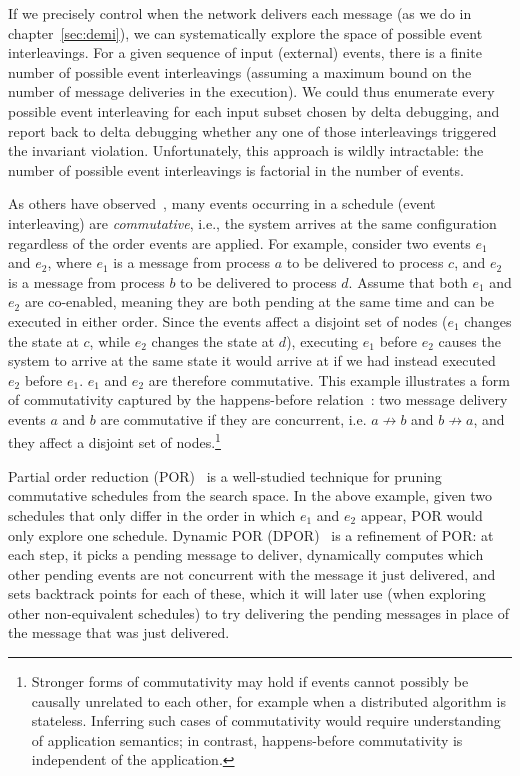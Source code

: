 If we precisely control when the network delivers each message (as we do in
chapter~\ref{sec:demi}), we can
systematically explore the space of possible event interleavings.
For a given sequence of input (external) events, there is a finite number of
possible event interleavings (assuming a maximum bound on the number of
message deliveries in the execution). We could thus enumerate every possible
event interleaving for each input subset chosen by delta debugging,
and report back to delta debugging whether any one of those interleavings
triggered the invariant violation. Unfortunately, this approach is wildly intractable: the
number of possible event interleavings is factorial in the number
of events.

As others have observed~\cite{godefroid1995partial}, many events occurring in
a schedule (event interleaving) are {\em commutative}, i.e., the system arrives at the same
configuration regardless of the order events are applied. For example, consider two events $e_1$ and $e_2$, where
$e_1$ is a message from process $a$ to be delivered to
process $c$, and $e_2$ is a message from process $b$
to be delivered to process $d$. Assume that both $e_1$ and $e_2$ are co-enabled, meaning they are both pending at the same time and can be executed in either order. Since
the events affect a disjoint set of nodes ($e_1$ changes the state at $c$, while $e_2$ changes the state at $d$), executing $e_1$ before $e_2$ causes the system to arrive at the same state it would arrive at if we had instead executed $e_2$ before $e_1$.
$e_1$ and $e_2$ are therefore commutative. This example
illustrates a form of commutativity captured by the happens-before relation~\cite{Lamport:1978:TCO:359545.359563}: two message delivery events
$a$ and $b$ are commutative if they are concurrent, i.e. $a \not\rightarrow b$
and $b \not\rightarrow a$, and they affect a disjoint set of nodes.\footnote{
Stronger forms of
commutativity may hold if events cannot possibly be causally unrelated to each other, for
example when a distributed algorithm is stateless. Inferring such cases of
commutativity would require understanding of application semantics; in
contrast, happens-before commutativity is independent of the application.}

Partial order reduction (POR)~\cite{godefroid1995partial,flanagan2005dynamic} is a well-studied technique for pruning commutative schedules from the search space. In the above example, given two schedules that only differ in the order
in which $e_1$ and $e_2$ appear, POR would only explore one schedule. Dynamic POR (DPOR)~\cite{flanagan2005dynamic} is a
refinement of POR: at each
step, it picks a pending message to deliver, dynamically computes which
other pending events are not concurrent with the message it just delivered,
and sets backtrack points for each of these, which it will later use (when
exploring other non-equivalent schedules) to try delivering the pending
messages in place of the message that was just delivered.

